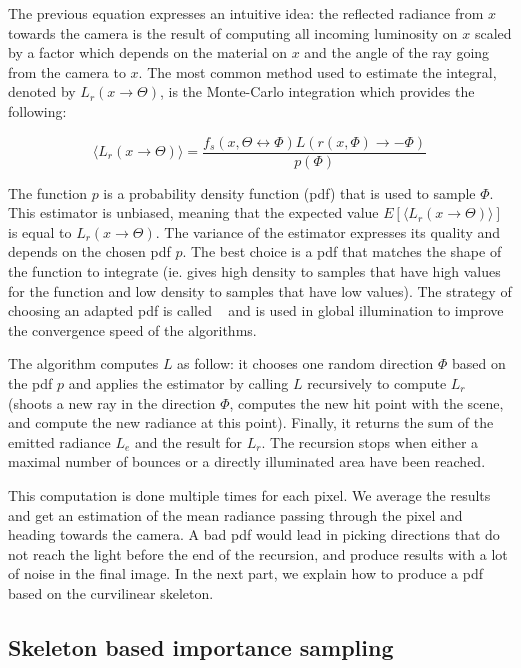 The previous equation expresses an intuitive idea: the reflected radiance from $x$ towards the camera is the result of computing all incoming luminosity on $x$ scaled by a factor which depends on the material on $x$ and the angle of the ray going from the camera to $x$. The most common method used to estimate the integral, denoted by $L_r(x \rightarrow \Theta)$, is the Monte-Carlo integration which provides the following:

\begin{equation*}
\langle L_r(x \rightarrow \Theta) \rangle = \frac{f_s(x, \Theta \leftrightarrow \Phi) L(r(x, \Phi) \rightarrow -\Phi)}{p(\Phi)}
\end{equation*}

The function $p$ is a probability density function (pdf) that is used to sample $\Phi$. This estimator is unbiased, meaning that the expected value $E[\langle L_r(x \rightarrow \Theta) \rangle]$ is equal to $L_r(x \rightarrow \Theta)$. The variance of the estimator expresses its quality and depends on the chosen pdf $p$. The best choice is a pdf that matches the shape of the function to integrate (ie. gives high density to samples that have high values for the function and low density to samples that have low values).
The strategy of choosing an adapted pdf is called ~\cite{Ka86} and is used in global illumination to improve the convergence speed of the algorithms.

The algorithm computes $L$ as follow: it chooses one random direction $\Phi$ based on the pdf $p$ and applies the estimator by calling $L$ recursively to compute $L_r$ (shoots a new ray in the direction $\Phi$, computes the new hit point with the scene, and compute the new radiance at this point). Finally, it returns the sum of the emitted radiance $L_e$ and the result for $L_r$. The recursion stops when either a maximal number of bounces or a directly illuminated area have been reached.

This computation is done multiple times for each pixel. We average the results and get an estimation of the mean radiance passing through the pixel and heading towards the camera.
A bad pdf would lead in picking directions that do not reach the light before the end of the recursion, and produce results with a lot of noise in the final image. In the next part, we explain how to produce a pdf based on the curvilinear skeleton.


\subsection{Skeleton based importance sampling}


